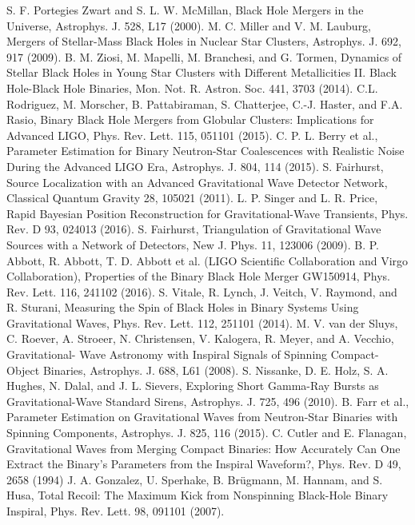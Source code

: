 \documentclass[binding=0.6cm, LaM]{sapthesis}
\begin{document}
\begin{thebibliography}{500}
         S. F. Portegies Zwart and S. L. W. McMillan, Black Hole Mergers in the Universe, Astrophys. J. 528, L17 (2000).
         M. C. Miller and V. M. Lauburg, Mergers of Stellar-Mass Black Holes in Nuclear Star Clusters, Astrophys. J. 692, 917 (2009).
         B. M. Ziosi, M. Mapelli, M. Branchesi, and G. Tormen, Dynamics of Stellar Black Holes in Young Star Clusters with Different Metallicities II. Black Hole-Black Hole Binaries, Mon. Not. R. Astron. Soc. 441, 3703 (2014).
          C.L. Rodriguez, M. Morscher, B. Pattabiraman, S. Chatterjee, C.-J. Haster, and F.A. Rasio, Binary Black Hole Mergers from Globular Clusters: Implications for Advanced LIGO, Phys. Rev. Lett. 115, 051101 (2015).
          C. P. L. Berry et al., Parameter Estimation for Binary Neutron-Star Coalescences with Realistic Noise During the Advanced LIGO Era, Astrophys. J. 804, 114 (2015).
 	 S. Fairhurst, Source Localization with an Advanced Gravitational Wave Detector Network, Classical Quantum Gravity 28, 105021 (2011).
          L. P. Singer and L. R. Price, Rapid Bayesian Position Reconstruction for Gravitational-Wave Transients, Phys. Rev. D 93, 024013 (2016).
   	 S. Fairhurst, Triangulation of Gravitational Wave Sources with a Network of Detectors, New J. Phys. 11, 123006 (2009).
    	 B. P. Abbott, R. Abbott, T. D. Abbott et al. (LIGO Scientific Collaboration and Virgo Collaboration), Properties of the Binary Black Hole Merger GW150914, Phys. Rev. Lett. 116, 241102 (2016).
 	 S. Vitale, R. Lynch, J. Veitch, V. Raymond, and R. Sturani, Measuring the Spin of Black Holes in Binary Systems Using Gravitational Waves, Phys. Rev. Lett. 112, 251101 (2014). 
 	 M. V. van der Sluys, C. Roever, A. Stroeer, N. Christensen, V. Kalogera, R. Meyer, and A. Vecchio, Gravitational- Wave Astronomy with Inspiral Signals of Spinning Compact-Object Binaries,        Astrophys. J. 688, L61 (2008).
         S. Nissanke, D. E. Holz, S. A. Hughes, N. Dalal, and J. L. Sievers, Exploring Short Gamma-Ray Bursts as Gravitational-Wave Standard Sirens, Astrophys. J. 725, 496 (2010).
          B. Farr et al., Parameter Estimation on Gravitational Waves from Neutron-Star Binaries with Spinning Components, Astrophys. J. 825, 116 (2015).
    	 C. Cutler and E. Flanagan, Gravitational Waves from Merging Compact Binaries: How Accurately Can One Extract the Binary’s Parameters from the Inspiral Waveform?, Phys. Rev. D 49, 2658 (1994) 
   	 J. A. Gonzalez, U. Sperhake, B. Brügmann, M. Hannam, and S. Husa, Total Recoil: The Maximum Kick from Nonspinning Black-Hole Binary Inspiral, Phys. Rev. Lett. 98, 091101 (2007).

\end{thebibliography}
\end{document}

